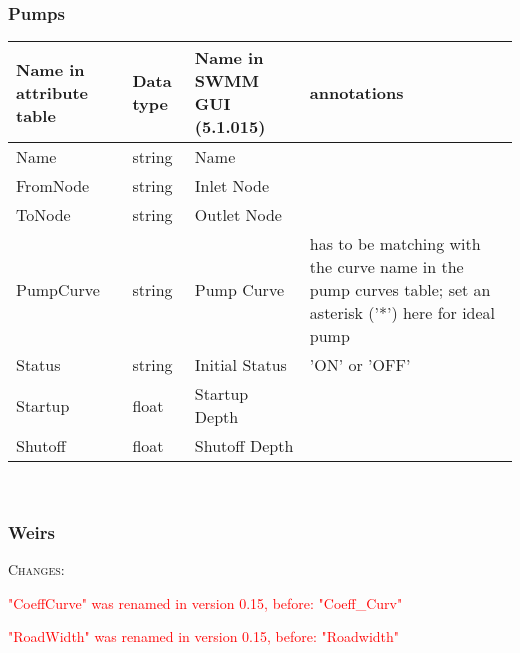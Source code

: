 \documentclass[10pt,a4paper,oneside]{scrbook}
\begin{document}
\subsubsection{Pumps}
\begin{tabular}{p{1.7cm}|p{1.3cm}|P{3cm}|P{8cm}}
\hline 
\textbf{Name in attribute table} & \textbf{Data type} & \textbf{Name in SWMM GUI (5.1.015)} & \textbf{annotations}\\ 
\hline 
Name & string & Name & \\
FromNode & string & Inlet Node & \\ 
ToNode & string & Outlet Node&  \\ 
PumpCurve & string & Pump Curve & has to be matching with the curve name in the pump curves table; set an asterisk ('*') here for ideal pump \\
Status & string & Initial Status & 'ON' or 'OFF' \\
Startup & float & Startup Depth& \\
Shutoff & float & Shutoff Depth & \\
\hline
\end{tabular}
\\

\subsubsection{Weirs}
\textsc{Changes}:

\textcolor{red}{"CoeffCurve" was renamed in version 0.15, before: "Coeff\_Curv"}

\textcolor{red}{"RoadWidth" was renamed in version 0.15, before: "Roadwidth"}
\end{document}
